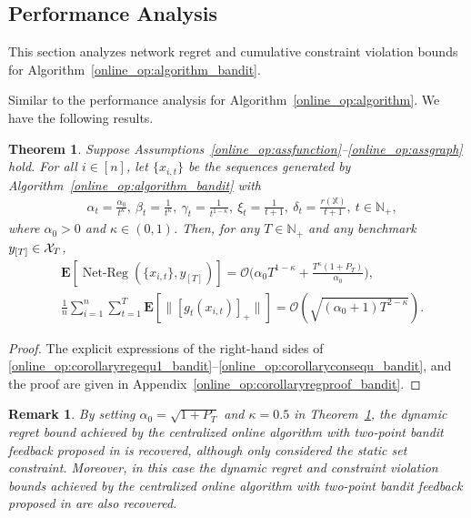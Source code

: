 \documentclass[12pt,draftcls,onecolumn]{IEEEtran}%
\newtheorem{theorem}{Theorem}
\newtheorem{remark}{Remark}
\DeclareMathOperator{\NetReg}{Net-Reg}
\begin{document}
\subsection{Performance Analysis}
This section analyzes network regret and cumulative constraint violation bounds for Algorithm~\ref{online_op:algorithm_bandit}.


Similar to the performance analysis for Algorithm~\ref{online_op:algorithm}. We have the following results.

\begin{theorem}\label{online_op:corollaryreg_bandit}
	Suppose Assumptions~\ref{online_op:assfunction}--\ref{online_op:assgraph} hold. For all $i\in[n]$, let $\{x_{i,t}\}$ be the sequences generated by Algorithm~\ref{online_op:algorithm_bandit} with
	\begin{align}\label{online_op:stepsize1_bandit}
		&\alpha_t=\frac{\alpha_0}{t^{\kappa}},~\beta_t=\frac{1}{t^{\kappa}},
		~\gamma_t=\frac{1}{t^{1-\kappa}},~\xi_{t}=\frac{1}{t+1},~\delta_{t}=\frac{r(\mathbb{X})}{t+1},~t\in\mathbb{N}_+,
	\end{align} where $\alpha_0>0$ and $\kappa\in(0,1)$. %
	Then, for any $T\in\mathbb{N}_+$ and any benchmark $y_{[T]}\in{\mathcal{X}}_{T}$,
	\begin{align}
		&\mathbf{E}[\NetReg(\{x_{i,t}\},y_{[T]})]
		=\mathcal{O}\Big(\alpha_0 T^{1-\kappa}+\frac{T^\kappa(1+P_T)}{\alpha_0}\Big),\label{online_op:corollaryregequ1_bandit}\\
		&\frac{1}{n}\sum_{i=1}^n\sum_{t=1}^T\mathbf{E}[\|[g_{t}(x_{i,t})]_+\|]=
		\mathcal{O}(\sqrt{(\alpha_0+1)T^{2-\kappa}}).\label{online_op:corollaryconsequ_bandit}
	\end{align}
\end{theorem}
\begin{proof}
The explicit expressions of the right-hand sides of \eqref{online_op:corollaryregequ1_bandit}--\eqref{online_op:corollaryconsequ_bandit}, and the proof are given in  Appendix~\ref{online_op:corollaryregproof_bandit}.
\end{proof}
\begin{remark}\label{online_op:remark_dynamic_bandit}
	By setting $\alpha_0=\sqrt{1+P_T}$ and  $\kappa=0.5$ in Theorem~\ref{online_op:corollaryreg_bandit}, the dynamic regret bound achieved by the centralized online algorithm with two-point bandit feedback proposed in \cite{yi2016tracking} is recovered, although \cite{yi2016tracking} only considered the static set constraint. Moreover, in this case the dynamic regret and constraint violation bounds achieved by the centralized online algorithm with two-point bandit feedback proposed in \cite{cao2019online} are also recovered.
\end{remark}
\end{document}

